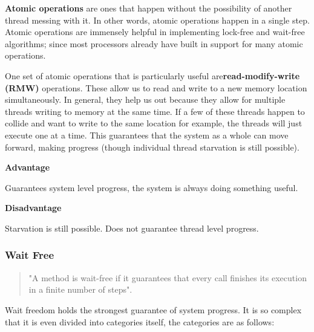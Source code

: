 \documentclass[letterpaper, 12pt]{article}
\begin{document}
\newpage

{\bfseries Atomic operations} are ones that happen without the possibility of another thread 
messing with it. In other words, atomic operations happen in a single step. Atomic operations 
are immensely helpful in implementing lock-free and wait-free algorithms; since most 
processors already have built in support for many atomic operations. 

\par\vspace{\baselineskip}
One set of atomic operations that is particularly useful are{\bfseries read-modify-write (RMW)} 
operations. These allow us to read and write to a new memory location simultaneously. In general, 
they help us out because they allow for multiple threads writing to memory at the same time. 
If a few of these threads happen to collide and want to write to the same location for example, 
the threads will just execute one at a time. This guarantees that the system as a whole can move 
forward, making progress (though individual thread starvation is still possible).  

\par\vspace{\baselineskip}

{\bfseries Advantage} \par\vspace{\baselineskip}
Guarantees system level progress, the system is always doing something useful.


{\bfseries Disadvantage} 
\par\vspace{\baselineskip}
Starvation is still possible. Does not guarantee thread level progress. 

\par\vspace{\baselineskip}

\subsubsection{Wait Free}
\begin{quotation}
	"A method is wait-free if it guarantees that every call finishes its execution
	in a finite number of steps"\citep[p. 59]{artofmulti}.
\end{quotation}

Wait freedom holds the strongest guarantee of system progress. It is so complex that it is 
even divided into categories itself, the categories are as follows:
\end{document}
